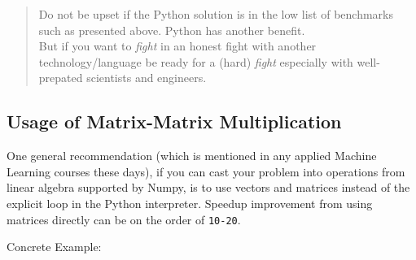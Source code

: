 \documentclass[
]{article}
\begin{document}
\begin{quote}
Do not be upset if the Python solution is in the low list of benchmarks
such as presented above. Python has another benefit.\\
But if you want to \emph{fight} in an honest fight with another
technology/language be ready for a (hard) \emph{fight} especially with
well-prepated scientists and engineers.
\end{quote}

\hypertarget{usage-of-matrix-matrix-multiplication}{%
\subsection{Usage of Matrix-Matrix
Multiplication}\label{usage-of-matrix-matrix-multiplication}}

One general recommendation (which is mentioned in any applied Machine
Learning courses these days), if you can cast your problem into
operations from linear algebra supported by Numpy, is to use vectors and
matrices instead of the explicit loop in the Python interpreter. Speedup
improvement from using matrices directly can be on the order of
\texttt{10-20}.

Concrete Example:
\end{document}
